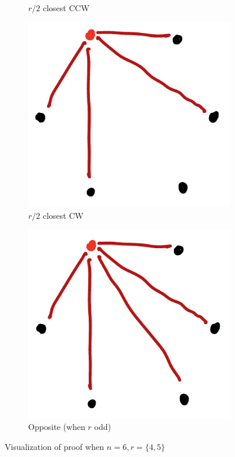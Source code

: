 \begin{figure}[ht]
\begin{center}
\begin{subfigure}{0.23\textwidth}
      \caption{\(r/2\) closest CCW}
    \end{subfigure}
    \hfill
    \begin{subfigure}{0.23\textwidth}
      \includegraphics[width=\textwidth]{figures/l02/l02-step3}
      \caption{\(r/2\) closest CW}
    \end{subfigure}
    \hfill
    \begin{subfigure}{0.23\textwidth}
      \includegraphics[width=\textwidth]{figures/l02/l02-step4}
      \caption{Opposite (when \(r\) odd)}
    \end{subfigure}
    \hfill
  \end{center}
  \caption{Visualization of proof when \(n=6, r=\{4, 5\}\)}\label{fig:rn-proof-viz}
\end{figure}

